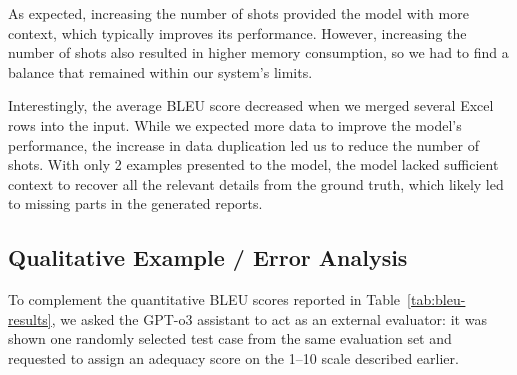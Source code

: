\documentclass[fleqn,moreauthors,10pt]{ds_report}
\begin{document}
As expected, increasing the number of shots provided the model with more context, which typically improves its performance. However, increasing the number of shots also resulted in higher memory consumption, so we had to find a balance that remained within our system's limits.

Interestingly, the average BLEU score decreased when we merged several Excel rows into the input. While we expected more data to improve the model's performance, the increase in data duplication led us to reduce the number of shots. With only 2 examples presented to the model, the model lacked sufficient context to recover all the relevant details from the ground truth, which likely led to missing parts in the generated reports.

\subsection{Qualitative Example / Error Analysis}
\label{subsec:qualitative}

To complement the quantitative BLEU scores reported in Table~\ref{tab:bleu-results}, we asked the GPT\mbox{-}o3 assistant to act as an external evaluator: it was shown one randomly selected test case from the same evaluation set and requested to assign an adequacy score on the 1–10 scale described earlier.
\end{document}
